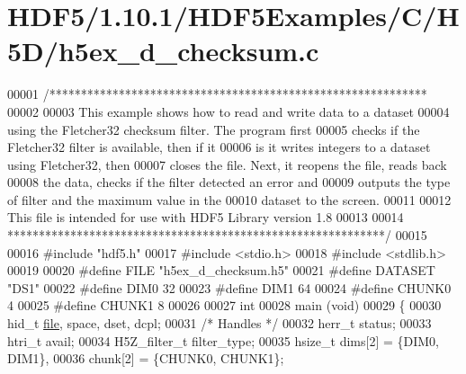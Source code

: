 \hypertarget{_h_d_f5_21_810_81_2_h_d_f5_examples_2_c_2_h5_d_2h5ex__d__checksum_8c_source}{}\section{H\+D\+F5/1.10.1/\+H\+D\+F5\+Examples/\+C/\+H5\+D/h5ex\+\_\+d\+\_\+checksum.c}
\label{_h_d_f5_21_810_81_2_h_d_f5_examples_2_c_2_h5_d_2h5ex__d__checksum_8c_source}

\begin{DoxyCode}
00001 \textcolor{comment}{/************************************************************}
00002 \textcolor{comment}{}
00003 \textcolor{comment}{  This example shows how to read and write data to a dataset}
00004 \textcolor{comment}{  using the Fletcher32 checksum filter.  The program first}
00005 \textcolor{comment}{  checks if the Fletcher32 filter is available, then if it}
00006 \textcolor{comment}{  is it writes integers to a dataset using Fletcher32, then}
00007 \textcolor{comment}{  closes the file.  Next, it reopens the file, reads back}
00008 \textcolor{comment}{  the data, checks if the filter detected an error and}
00009 \textcolor{comment}{  outputs the type of filter and the maximum value in the}
00010 \textcolor{comment}{  dataset to the screen.}
00011 \textcolor{comment}{}
00012 \textcolor{comment}{  This file is intended for use with HDF5 Library version 1.8}
00013 \textcolor{comment}{}
00014 \textcolor{comment}{ ************************************************************/}
00015 
00016 \textcolor{preprocessor}{#include "hdf5.h"}
00017 \textcolor{preprocessor}{#include <stdio.h>}
00018 \textcolor{preprocessor}{#include <stdlib.h>}
00019 
00020 \textcolor{preprocessor}{#define FILE            "h5ex\_d\_checksum.h5"}
00021 \textcolor{preprocessor}{#define DATASET         "DS1"}
00022 \textcolor{preprocessor}{#define DIM0            32}
00023 \textcolor{preprocessor}{#define DIM1            64}
00024 \textcolor{preprocessor}{#define CHUNK0          4}
00025 \textcolor{preprocessor}{#define CHUNK1          8}
00026 
00027 \textcolor{keywordtype}{int}
00028 main (\textcolor{keywordtype}{void})
00029 \{
00030     hid\_t           \hyperlink{structfile}{file}, space, dset, dcpl;
00031                                                 \textcolor{comment}{/* Handles */}
00032     herr\_t          status;
00033     htri\_t          avail;
00034     H5Z\_filter\_t    filter\_type;
00035     hsize\_t         dims[2] = \{DIM0, DIM1\},
00036                     chunk[2] = \{CHUNK0, CHUNK1\};

\end{DoxyCode}
